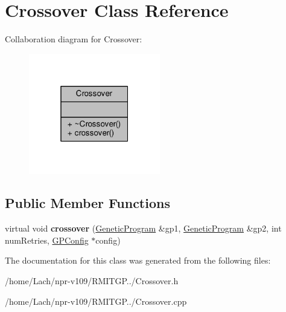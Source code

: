 \hypertarget{classCrossover}{}\section{Crossover Class Reference}
\label{classCrossover}


Collaboration diagram for Crossover\+:
\nopagebreak
\begin{figure}[H]
\begin{center}
\leavevmode
\includegraphics[width=163pt]{classCrossover__coll__graph}
\end{center}
\end{figure}
\subsection*{Public Member Functions}
\begin{DoxyCompactItemize}
\item 
\hypertarget{classCrossover_a52fadaa841c3fc0113b991da70b3675f}{}\label{classCrossover_a52fadaa841c3fc0113b991da70b3675f} 
virtual void {\bfseries crossover} (\hyperlink{classGeneticProgram}{Genetic\+Program} \&gp1, \hyperlink{classGeneticProgram}{Genetic\+Program} \&gp2, int num\+Retries, \hyperlink{classGPConfig}{G\+P\+Config} $\ast$config)
\end{DoxyCompactItemize}


The documentation for this class was generated from the following files\+:\begin{DoxyCompactItemize}
\item 
/home/\+Lach/npr-\/v109/\+R\+M\+I\+T\+G\+P../Crossover.\+h\item 
/home/\+Lach/npr-\/v109/\+R\+M\+I\+T\+G\+P../Crossover.\+cpp\end{DoxyCompactItemize}
